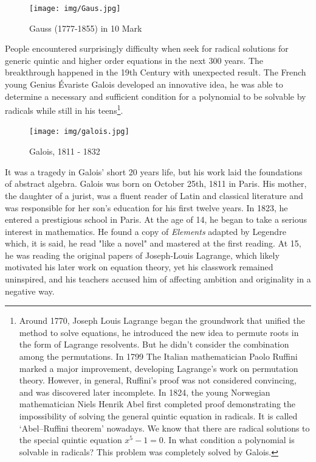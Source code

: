 \documentclass[b5paper]{article}
\begin{document}
\begin{figure}[htbp]
 \centering
 \texttt{[image: img/Gaus.jpg]}
 \captionsetup{labelformat=empty}
 \caption{Gauss (1777-1855) in 10 Mark}
 \label{fig:Gauss}
\end{figure}

People encountered surprisingly difficulty when seek for radical solutions for generic quintic and higher order equations in the next 300 years. The breakthrough happened in the 19th Century with unexpected result. The French young Genius Évariste Galois developed an innovative idea, he was able to determine a necessary and sufficient condition for a polynomial to be solvable by radicals while still in his teens\footnote{Around 1770, Joseph Louis Lagrange began the groundwork that unified the method to solve equations, he introduced the new idea to permute roots in the form of Lagrange resolvents. But he didn't consider the combination among the permutations. In 1799 The Italian mathematician Paolo Ruffini marked a major improvement, developing Lagrange's work on permutation theory. However, in general, Ruffini's proof was not considered convincing, and was discovered later incomplete. In 1824, the young Norwegian mathematician Niels Henrik Abel first completed proof demonstrating the impossibility of solving the general quintic equation in radicals. It is called `Abel–Ruffini theorem' nowadays. We know that there are radical solutions to the special quintic equation $x^5-1=0$. In what condition a polynomial is solvable in radicals? This problem was completely solved by Galois\cite{Wiki-Galois-theory}.}.

\begin{figure}[htbp]
 \centering
 \texttt{[image: img/galois.jpg]}
 \captionsetup{labelformat=empty}
 \caption{Galois, 1811 - 1832}
 \label{fig:Galois}
\end{figure}

It was a tragedy in Galois' short 20 years life, but his work laid the foundations of abstract algebra. Galois was born on October 25th, 1811 in Paris. His mother, the daughter of a jurist, was a fluent reader of Latin and classical literature and was responsible for her son's education for his first twelve years. In 1823, he entered a prestigious school in Paris. At the age of 14, he began to take a serious interest in mathematics. He found a copy of {\em Elements} adapted by Legendre which, it is said, he read "like a novel" and mastered at the first reading. At 15, he was reading the original papers of Joseph-Louis Lagrange, which likely motivated his later work on equation theory, yet his classwork remained uninspired, and his teachers accused him of affecting ambition and originality in a negative way.
\end{document}
